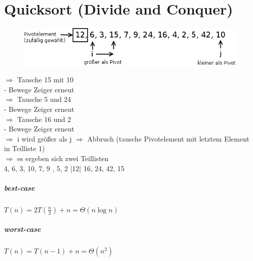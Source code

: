 \chapter{Quicksort (Divide and Conquer)}

\begin{figure}[h]
\includegraphics[width=0.6\linewidth]{05/Grafik/img1.png}
\end{figure}

$\Rightarrow $ Tausche 15 mit 10 \\
- Bewege Zeiger erneut \\
$\Rightarrow $ Tausche 5 und 24 \\
- Bewege Zeiger erneut \\
$\Rightarrow $ Tausche 16 und 2 \\
- Bewege Zeiger erneut \\
$\Rightarrow $ i wird größer als j $\Rightarrow $  Abbruch (tausche Pivotelement mit letztem Element in Teilliste 1) \\
$\Rightarrow $ es ergeben sich zwei Teillisten \\

4, 6, 3, 10, 7, 9 , 5, 2 |12| 16, 24, 42, 15
\paragraph{best-case}  $T(n) = 2 T \left(\frac{n}{2} \right) + n = \Theta(n \log n) $
\paragraph{worst-case}  $T(n) = T(n-1) + n = \Theta(n^2) $
